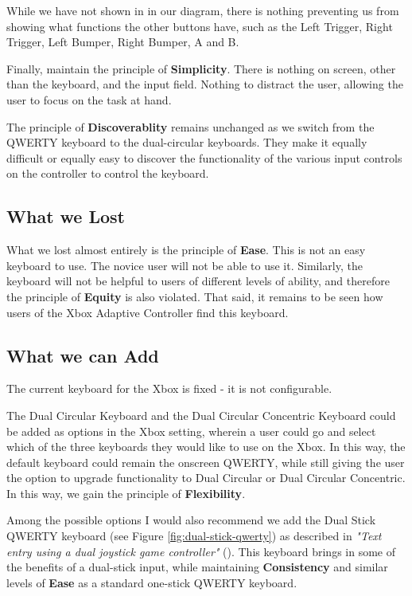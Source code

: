 \documentclass[
	letterpaper, %
]{jdf}
\begin{document}
While we have not shown in in our diagram, there is nothing preventing us from showing what functions the other buttons have, such as the Left Trigger, Right Trigger, Left Bumper, Right Bumper, A and B.

Finally, maintain the principle of \textbf{Simplicity}. There is nothing on screen, other than the keyboard, and the input field. Nothing to distract the user, allowing the user to focus on the task at hand.

The principle of \textbf{Discoverablity} remains unchanged as we switch from the QWERTY keyboard to the dual-circular keyboards. They make it equally difficult or equally easy to discover the functionality of the various input controls on the controller to control the keyboard.


\subsection{What we Lost}
What we lost almost entirely is the principle of \textbf{Ease}. This is not an easy keyboard to use. The novice user will not be able to use it. Similarly, the keyboard will not be helpful to users of different levels of ability, and therefore the principle of \textbf{Equity} is also violated. That said, it remains to be seen how users of the Xbox Adaptive Controller find this keyboard.

\subsection{What we can Add}
The current keyboard for the Xbox is fixed - it is not configurable.

The Dual Circular Keyboard and the Dual Circular Concentric Keyboard could be added as options in the Xbox setting, wherein a user could go and select which of the three keyboards they would like to use on the Xbox. In this way, the default keyboard could remain the onscreen QWERTY, while still giving the user the option to upgrade functionality to Dual Circular or Dual Circular Concentric. In this way, we gain the principle of \textbf{Flexibility}.

Among the possible options I would also recommend we add the Dual Stick QWERTY keyboard (see Figure \ref{fig:dual-stick-qwerty}) as described in \textit{"Text entry using a dual joystick game controller"} (\cite{wilson_agrawala_2006}). This keyboard brings in some of the benefits of a dual-stick input, while maintaining \textbf{Consistency} and similar levels of \textbf{Ease} as a standard one-stick QWERTY keyboard.
\end{document}
